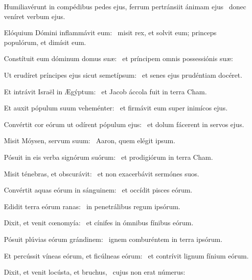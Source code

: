 \item Humiliavérunt in compédibus pedes ejus, ferrum pertránsiit ánimam ejus~\psstar{} donec veníret verbum ejus.

\item Elóquium Dómini inflammávit eum:~\psstar{} misit rex, et solvit eum; princeps populórum, et dimísit eum.

\item Constítuit eum dóminum domus suæ:~\psstar{} et príncipem omnis possessiónis suæ:

\item Ut erudíret príncipes ejus sicut semetípsum:~\psstar{} et senes ejus prudéntiam docéret.

\item Et intrávit Israël in Ægýptum:~\psstar{} et Jacob áccola fuit in terra Cham.

\item Et auxit pópulum suum veheménter:~\psstar{} et firmávit eum super inimícos ejus.

\item Convértit cor eórum ut odírent pópulum ejus:~\psstar{} et dolum fácerent in servos ejus.

\item Misit Móysen, servum suum:~\psstar{} Aaron, quem elégit ipsum.

\item Pósuit in eis verba signórum suórum:~\psstar{} et prodigiórum in terra Cham.

\item Misit ténebras, et obscurávit:~\psstar{} et non exacerbávit sermónes suos.

\item Convértit aquas eórum in sánguinem:~\psstar{} et occídit pisces eórum.

\item Edidit terra eórum ranas:~\psstar{} in penetrálibus regum ipsórum.

\item Dixit, et venit cœnomyía:~\psstar{} et cínifes in ómnibus fínibus eórum.

\item Pósuit plúvias eórum grándinem:~\psstar{} ignem comburéntem in terra ipsórum.

\item Et percússit víneas eórum, et ficúlneas eórum:~\psstar{} et contrívit lignum fínium eórum.

\item Dixit, et venit locústa, et bruchus,~\psstar{} cujus non erat númerus:

